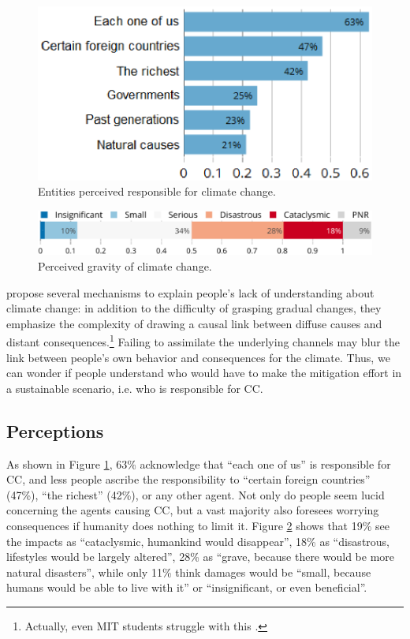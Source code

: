 \documentclass[english,5p,authoryear]{elsarticle}
\begin{document}


\begin{figure}[!htbp]
\centering
\includegraphics[width=0.75\columnwidth]{Images_EPS/CC_responsiblec.eps}
\caption{Entities perceived responsible for climate change.}
\label{fig:responsible}
\end{figure}

\begin{figure}[t]
\centering
\includegraphics[width=\columnwidth]{Images_EPS/CC_effects_nolegend.eps}
\caption{Perceived gravity of climate change.}
\label{fig:gravity}
\end{figure}

\citet{millner_beliefs_2016} propose several mechanisms to explain people's lack of understanding about climate change: in addition to the difficulty of grasping gradual changes, they emphasize the complexity of drawing a causal link between diffuse causes and distant consequences.\footnote{Actually, even MIT students struggle with this \citep{sterman_risk_2008}.} Failing to assimilate the underlying channels may blur the link between people's own behavior and consequences for the climate. Thus, we can wonder if people understand who would have to make the mitigation effort in a sustainable scenario, i.e. who is responsible for CC.


    \subsection{Perceptions\label{subsec:opinions}}
As shown in Figure \ref{fig:responsible}, 63\% acknowledge that ``each one of us'' is responsible for CC, and less people ascribe the responsibility to ``certain foreign countries'' (47\%), ``the richest'' (42\%), or any other agent.  Not only do people seem lucid concerning the agents causing CC, but a vast majority also foresees worrying consequences if humanity does nothing to limit it. Figure \ref{fig:gravity} shows that 19\% see the impacts as ``cataclysmic, humankind would disappear'', 18\% as ``disastrous, lifestyles would be largely altered'', 28\% as ``grave, because there would be more natural disasters'', while only 11\% think damages would be ``small, because humans would be able to live with it'' or ``insignificant, or even beneficial''. 
\end{document}
